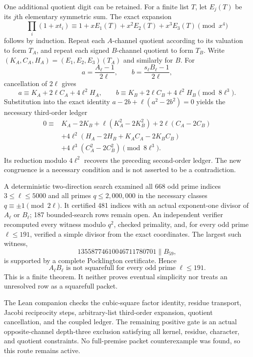 One additional quotient digit can be retained.  For a finite list $T$, let
$E_j(T)$ be its $j$th elementary symmetric sum.  The exact expansion
\[
 \prod_i(1+xt_i)\equiv
 1+xE_1(T)+x^2E_2(T)+x^3E_3(T)\pmod{x^4}
\]
follows by induction.  Repeat each $A$-channel quotient according to its
valuation to form $T_A$, and repeat each signed $B$-channel quotient to form
$T_B$.  Write $(K_A,C_A,H_A)=(E_1,E_2,E_3)(T_A)$ and similarly for $B$.
For
\[
 a=\frac{A_\ell-1}{2\ell},\qquad
 b=\frac{s_\ell B_\ell-1}{2\ell},
\]
cancellation of $2\ell$ gives
\[
 a\equiv K_A+2\ell C_A+4\ell^2H_A,\qquad
 b\equiv K_B+2\ell C_B+4\ell^2H_B\pmod{8\ell^3}.
\]
Substitution into the exact identity
$a-2b+\ell(a^2-2b^2)=0$ yields the necessary third-order ledger
\begin{align*}
0\equiv{}&K_A-2K_B+\ell(K_A^2-2K_B^2)+2\ell(C_A-2C_B)\\
 &+4\ell^2(H_A-2H_B+K_AC_A-2K_BC_B)\\
 &+4\ell^3(C_A^2-2C_B^2)\pmod{8\ell^3}.
\end{align*}
Its reduction modulo $4\ell^2$ recovers the preceding second-order ledger.
The new congruence is a necessary condition and is not asserted to be a
contradiction.

A deterministic two-direction search examined all 668 odd prime indices
$3\le\ell\le5000$ and all primes $q\le2{,}000{,}000$ in the necessary
classes $q\equiv\pm1\pmod{2\ell}$.  It certified 481 indices with an actual
exponent-one divisor of $A_\ell$ or $B_\ell$; 187 bounded-search rows remain
open.  An independent verifier recomputed every witness modulo $q^2$, checked
primality, and, for every odd prime $\ell\le191$, verified a simple divisor
from the exact coordinates.  The largest such witness,
\[
        13558774610046711780701\parallel B_{59},
\]
is supported by a complete Pocklington certificate.  Hence
\[
 \boxed{A_\ell B_\ell\text{ is not squarefull for every odd prime }
        \ell\le191.}
\]
This is a finite theorem.  It neither proves eventual simplicity nor treats
an unresolved row as a squarefull packet.

The Lean companion checks the cubic-square factor identity, residue
transport, Jacobi reciprocity steps, arbitrary-list third-order expansion,
quotient cancellation, and the coupled ledger.  The remaining positive gate
is an actual opposite-channel depth-three exclusion satisfying all kernel,
residue, character, and quotient constraints.  No full-premise packet
counterexample was found, so this route remains active.
